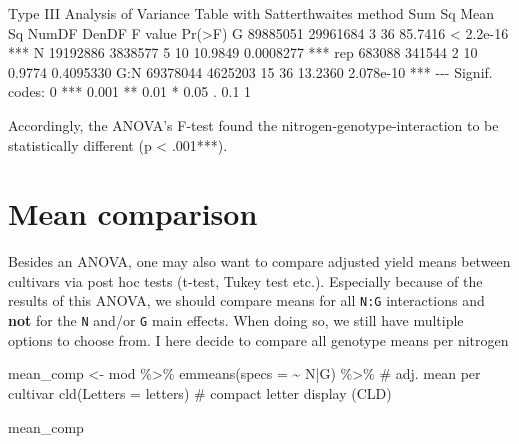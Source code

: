 \documentclass[
  letterpaper,
  DIV=11,
  numbers=noendperiod]{scrartcl}
\newenvironment{Shaded}{\begin{snugshade}}{\end{snugshade}}
\newcommand{\AttributeTok}[1]{\textcolor[rgb]{0.40,0.45,0.13}{#1}}
\newcommand{\CommentTok}[1]{\textcolor[rgb]{0.37,0.37,0.37}{#1}}
\newcommand{\FunctionTok}[1]{\textcolor[rgb]{0.28,0.35,0.67}{#1}}
\newcommand{\NormalTok}[1]{\textcolor[rgb]{0.00,0.23,0.31}{#1}}
\newcommand{\OtherTok}[1]{\textcolor[rgb]{0.00,0.23,0.31}{#1}}
\newcommand{\SpecialCharTok}[1]{\textcolor[rgb]{0.37,0.37,0.37}{#1}}
\begin{document}
\begin{Shaded}
\begin{Highlighting}[]
\NormalTok{Type III Analysis of Variance Table with Satterthwaite\textquotesingle{}s method}
\NormalTok{      Sum Sq  Mean Sq NumDF DenDF F value    Pr(\textgreater{}F)    }
\NormalTok{G   89885051 29961684     3    36 85.7416 \textless{} 2.2e{-}16 ***}
\NormalTok{N   19192886  3838577     5    10 10.9849 0.0008277 ***}
\NormalTok{rep   683088   341544     2    10  0.9774 0.4095330    }
\NormalTok{G:N 69378044  4625203    15    36 13.2360 2.078e{-}10 ***}
\NormalTok{{-}{-}{-}}
\NormalTok{Signif. codes:  0 \textquotesingle{}***\textquotesingle{} 0.001 \textquotesingle{}**\textquotesingle{} 0.01 \textquotesingle{}*\textquotesingle{} 0.05 \textquotesingle{}.\textquotesingle{} 0.1 \textquotesingle{} \textquotesingle{} 1}
\end{Highlighting}
\end{Shaded}

Accordingly, the ANOVA's F-test found the nitrogen-genotype-interaction
to be statistically different (p \textless{} .001***).

\hypertarget{mean-comparison}{%
\section{Mean comparison}\label{mean-comparison}}

Besides an ANOVA, one may also want to compare adjusted yield means
between cultivars via post hoc tests (t-test, Tukey test etc.).
Especially because of the results of this ANOVA, we should compare means
for all \texttt{N:G} interactions and \textbf{not} for the \texttt{N}
and/or \texttt{G} main effects. When doing so, we still have multiple
options to choose from. I here decide to compare all genotype means per
nitrogen

\begin{Shaded}
\begin{Highlighting}[]
\NormalTok{mean\_comp }\OtherTok{\textless{}{-}}\NormalTok{ mod }\SpecialCharTok{\%\textgreater{}\%} 
  \FunctionTok{emmeans}\NormalTok{(}\AttributeTok{specs =} \SpecialCharTok{\textasciitilde{}}\NormalTok{ N}\SpecialCharTok{|}\NormalTok{G) }\SpecialCharTok{\%\textgreater{}\%} \CommentTok{\# adj. mean per cultivar}
  \FunctionTok{cld}\NormalTok{(}\AttributeTok{Letters =}\NormalTok{ letters) }\CommentTok{\# compact letter display (CLD)}

\NormalTok{mean\_comp}
\end{Highlighting}
\end{Shaded}
\end{document}
